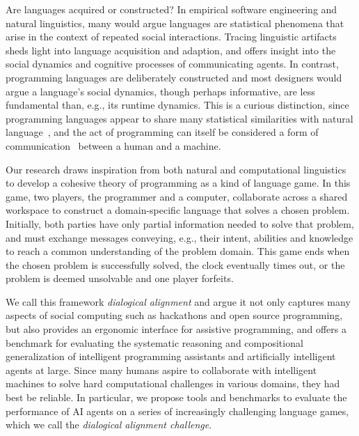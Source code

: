 \documentclass[sigplan,screen]{acmart}
\begin{document}

Are languages acquired or constructed? In empirical software engineering and natural linguistics, many would argue languages are statistical phenomena that arise in the context of repeated social interactions. Tracing linguistic artifacts sheds light into language acquisition and adaption, and offers insight into the social dynamics and cognitive processes of communicating agents. In contrast, programming languages are deliberately constructed and most designers would argue a language's social dynamics, though perhaps informative, are less fundamental than, e.g., its runtime dynamics. This is a curious distinction, since programming languages appear to share many statistical similarities with natural language~\cite{hindle2016naturalness}, and the act of programming can itself be considered a form of communication~\cite{demillo1979social} between a human and a machine.

Our research draws inspiration from both natural and computational linguistics to develop a cohesive theory of programming as a kind of language game. In this game, two players, the programmer and a computer, collaborate across a shared workspace to construct a domain-specific language that solves a chosen problem. Initially, both parties have only partial information needed to solve that problem, and must exchange messages conveying, e.g., their intent, abilities and knowledge to reach a common understanding of the problem domain. This game ends when the chosen problem is successfully solved, the clock eventually times out, or the problem is deemed unsolvable and one player forfeits.

We call this framework \emph{dialogical alignment} and argue it not only captures many aspects of social computing such as hackathons and open source programming, but also provides an ergonomic interface for assistive programming, and offers a benchmark for evaluating the systematic reasoning and compositional generalization of intelligent programming assistants and artificially intelligent agents at large. Since many humans aspire to collaborate with intelligent machines to solve hard computational challenges in various domains, they had best be reliable. In particular, we propose tools and benchmarks to evaluate the performance of AI agents on a series of increasingly challenging language games, which we call the \emph{dialogical alignment challenge}.
\end{document}
